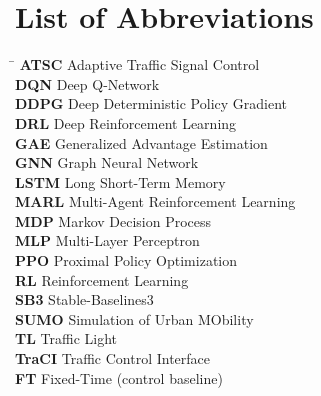 \documentclass[12pt,oneside,a4paper]{report}
\begin{document}
\clearpage
\pagestyle{fancy}
\tableofcontents

\clearpage
\listoffigures
{}

\clearpage
\listoftables
{}

\clearpage
\chapter*{List of Abbreviations}
\begin{singlespace}
\begin{tabbing}
  \hspace{2.2in}\= \kill
  \textbf{ATSC}  \> Adaptive Traffic Signal Control \\
  \textbf{DQN}   \> Deep Q-Network \\
  \textbf{DDPG}  \> Deep Deterministic Policy Gradient \\
  \textbf{DRL}   \> Deep Reinforcement Learning \\
  \textbf{GAE}   \> Generalized Advantage Estimation \\
  \textbf{GNN}   \> Graph Neural Network \\
  \textbf{LSTM}  \> Long Short-Term Memory \\
  \textbf{MARL}  \> Multi-Agent Reinforcement Learning \\
  \textbf{MDP}   \> Markov Decision Process \\
  \textbf{MLP}   \> Multi-Layer Perceptron \\
  \textbf{PPO}   \> Proximal Policy Optimization \\
  \textbf{RL}    \> Reinforcement Learning \\
  \textbf{SB3}   \> Stable-Baselines3 \\
  \textbf{SUMO}  \> Simulation of Urban MObility \\
  \textbf{TL}    \> Traffic Light \\
  \textbf{TraCI} \> Traffic Control Interface \\
  \textbf{FT}    \> Fixed-Time (control baseline) \\
\end{tabbing}
\end{singlespace}
\end{document}

